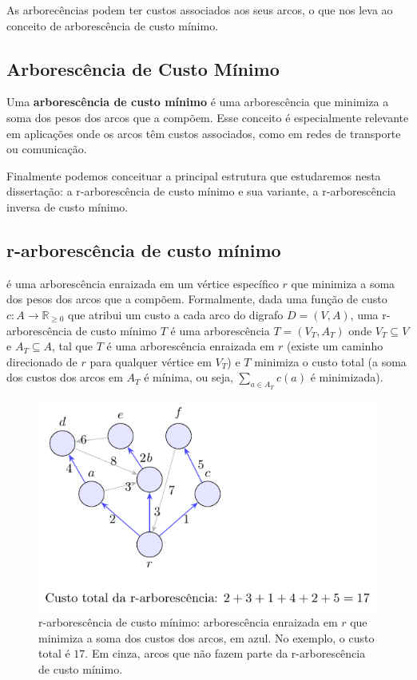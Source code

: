 As arborecências podem ter custos associados aos seus arcos, o que nos leva ao conceito de arborescência de custo mínimo.

\subsection{Arborescência de Custo Mínimo}

Uma \textbf{arborescência de custo mínimo} é uma arborescência que minimiza a soma dos pesos dos arcos que a compõem. Esse conceito é especialmente relevante em aplicações onde os arcos têm custos associados, como em redes de transporte ou comunicação.


Finalmente podemos conceituar a principal estrutura que estudaremos nesta dissertação: a r-arborescência de custo mínimo e sua variante, a r-arborescência inversa de custo mínimo.

\subsection{r-arborescência de custo mínimo}
é uma arborescência enraizada em um vértice específico \(r\) que minimiza a soma dos pesos dos arcos que a compõem. Formalmente, dada uma função de custo \(c: A \to \mathbb{R}_{\geq 0}\) que atribui um custo a cada arco do digrafo \(D = (V, A)\), uma r-arborescência de custo mínimo \(T\) é uma arborescência \(T = (V_T, A_T)\) onde \(V_T \subseteq V\) e \(A_T \subseteq A\), tal que \(T\) é uma arborescência enraizada em \(r\) (existe um caminho direcionado de \(r\) para qualquer vértice em \(V_T\)) e \(T\) minimiza o custo total (a soma dos custos dos arcos em \(A_T\) é mínima, ou seja, \(\sum_{a \in A_T} c(a)\) é minimizada).\begin{figure}[H]
	\centering
	\includegraphics[width=0.9\linewidth]{figures/fig_r_arborescencia_custo_minimo.pdf}

	\caption{r-arborescência de custo mínimo: arborescência enraizada em $r$ que minimiza a soma dos custos dos arcos, em azul. No exemplo, o custo total é $17$. Em cinza, arcos que não fazem parte da r-arborescência de custo mínimo.}
	\label{fig:r-arborescencia-custo-minimo}\end{figure}


